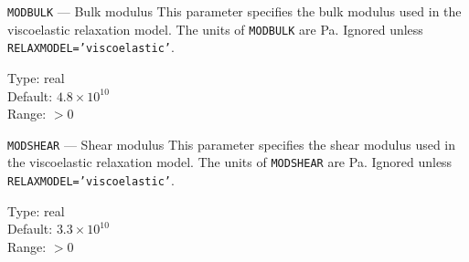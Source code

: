 \begin{keydescription}{\texttt{MODBULK} --- Bulk modulus}
%
  This parameter specifies the bulk modulus used in the 
  viscoelastic relaxation model. The units of \texttt{MODBULK} are Pa.
  Ignored unless \texttt{RELAXMODEL='viscoelastic'}.
  \begin{keytab}
    Type:    \> real \\
    Default: \> $4.8 \times 10^{10}$ \\
    Range:   \> $>0$
  \end{keytab}
\end{keydescription}

\begin{keydescription}{\texttt{MODSHEAR} --- Shear modulus}
%
  This parameter specifies the shear modulus used in the 
  viscoelastic relaxation model. The units of \texttt{MODSHEAR} are Pa.
  Ignored unless \texttt{RELAXMODEL='viscoelastic'}.
  \begin{keytab}
    Type:    \> real \\
    Default: \> $3.3 \times 10^{10}$ \\
    Range:   \> $>0$
  \end{keytab}
\end{keydescription}

\iffalse                       %
\begin{keydescription}{\texttt{NCLUS} --- Cluster size}
%
  This parameter specifies the number of atoms per cluster.
  \texttt{NCLUS} random interstitials are assumed to be clustered to
  one cluster each. The cluster is assumed to be a cylinder around the
  ion trajectory with radius \texttt{PMAX}. \texttt{NCLUS} may only be
  specified with \texttt{LAMO2=T}.
  \begin{keytab}
    Type:    \> integer \\
    Default: \> 1 \\
    Range:   \> $\ge 1$ \\
    Remark:  \> not yet implemented
  \end{keytab}
\end{keydescription}
\fi

